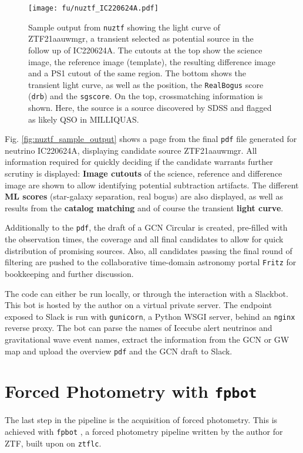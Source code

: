 \begin{figure}[h!]
    \texttt{[image: fu/nuztf\_IC220624A.pdf]}
    \caption[\texttt{nuztf} output]{Sample output from \texttt{nuztf} showing the light curve of ZTF21aauwmgr, a transient selected as potential source in the follow up of IC220624A. The cutouts at the top show the science image, the reference image (template), the resulting difference image and a PS1 cutout of the same region. The bottom shows the transient light curve, as well as the position, the \texttt{RealBogus} score (\texttt{drb}) and the \texttt{sgscore}. On the top, crossmatching information is shown. Here, the source is a source discovered by SDSS and flagged as likely QSO in MILLIQUAS.}
\end{figure}
Fig. \ref{fig:nuztf_sample_output} shows a page from the final \texttt{pdf} file generated for neutrino IC220624A, displaying candidate source ZTF21aauwmgr. All information required for quickly deciding if the candidate warrants further scrutiny is displayed: \textbf{Image cutouts} of the science, reference and difference image are shown to allow identifying potential subtraction artifacts. The different \textbf{ML scores} (star-galaxy separation, real bogus) are also displayed, as well as results from the \textbf{catalog matching} and of course the transient \textbf{light curve}.

Additionally to the \texttt{pdf}, the draft of a GCN Circular is created, pre-filled with the observation times, the coverage and all final candidates to allow for quick distribution of promising sources. Also, all candidates passing the final round of filtering are pushed to the collaborative time-domain astronomy portal \texttt{Fritz} for bookkeeping and further discussion.

The code can either be run locally, or through the interaction with a Slackbot. This bot is hosted by the author on a virtual private server. The endpoint exposed to Slack is run with \texttt{gunicorn}, a Python WSGI server, behind an \texttt{nginx} reverse proxy. The bot can parse the names of Icecube alert neutrinos and gravitational wave event names, extract the information from the GCN or GW map and upload the overview \texttt{pdf} and the GCN draft to Slack.

\section{Forced Photometry with \texttt{fpbot}} \label{fpbot}
The last step in the pipeline is the acquisition of forced photometry. This is achieved with \texttt{fpbot} , a forced photometry pipeline written by the author for ZTF, built upon on \texttt{ztflc}.


